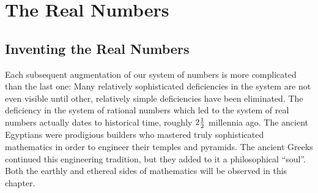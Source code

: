 \section{The Real Numbers}
\label{sec:reals}

\subsection{Inventing the Real Numbers}
\label{sec:real-history}

Each subsequent augmentation of our system of numbers is more complicated than the last one: Many relatively sophisticated deficiencies in the system are not even visible until other, relatively simple deficiencies have been eliminated.  The deficiency in the system of rational numbers which led to the system of real numbers actually dates to historical time, roughly $2 {1 \over 2}$ millennia ago.  The ancient Egyptians were prodigious builders who mastered truly sophisticated mathematics in order to engineer their temples and pyramids.  The ancient Greeks continued this engineering tradition, but they added to it a philosophical ``soul''.  Both the earthly and ethereal sides of mathematics will be observed in this chapter.

\smallskip

